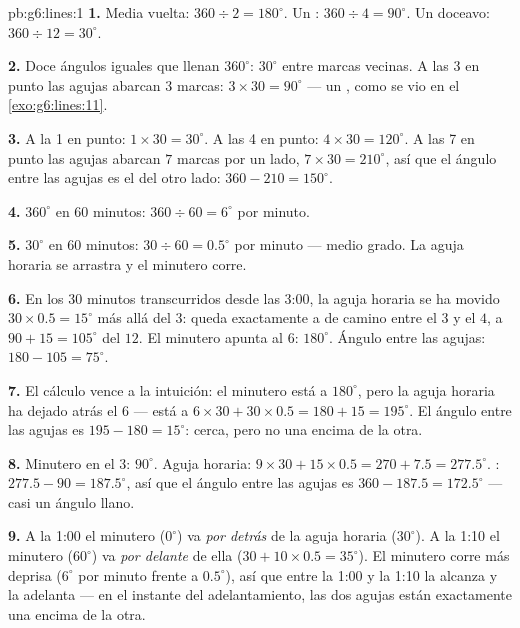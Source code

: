 \begin{solution}{pb:g6:lines:1}
\textbf{1.} Media vuelta: $360 \div 2 = 180^\circ$. Un :
$360 \div 4 = 90^\circ$. Un doceavo: $360 \div 12 = 30^\circ$.

\textbf{2.} Doce ángulos iguales que llenan $360^\circ$:
$30^\circ$ entre marcas vecinas. A las 3 en punto las agujas
abarcan $3$ marcas: $3 \times 30 = 90^\circ$ --- un , como se
vio en el \cref{exo:g6:lines:11}.

\textbf{3.} A la 1 en punto: $1 \times 30 = 30^\circ$. A las
4 en punto: $4 \times 30 = 120^\circ$. A las 7 en punto las agujas
abarcan $7$ marcas por un lado, $7 \times 30 = 210^\circ$, así que el
ángulo entre las agujas es el del otro lado:
$360 - 210 = 150^\circ$.

\textbf{4.} $360^\circ$ en $60$ minutos: $360 \div 60 =
6^\circ$ por minuto.

\textbf{5.} $30^\circ$ en $60$ minutos: $30 \div 60 = 0.5^\circ$
por minuto --- medio grado. La aguja horaria se arrastra y el
minutero corre.

\textbf{6.} En los $30$ minutos transcurridos desde las 3:00, la aguja horaria se ha
movido $30 \times 0.5 = 15^\circ$ más allá del $3$: queda exactamente
a  de camino entre el $3$ y el $4$, a $90 + 15 = 105^\circ$
del $12$. El minutero apunta al $6$:
$180^\circ$. Ángulo entre las agujas:
$180 - 105 = 75^\circ$.

\textbf{7.} El cálculo vence a la intuición: el minutero está a
$180^\circ$, pero la aguja horaria ha dejado atrás el $6$ --- está a
$6 \times 30 + 30 \times 0.5 = 180 + 15 = 195^\circ$. El ángulo
entre las agujas es $195 - 180 = 15^\circ$: cerca, pero no una
encima de la otra.

\textbf{8.} Minutero en el $3$: $90^\circ$. Aguja horaria:
$9 \times 30 + 15 \times 0.5 = 270 + 7.5 = 277.5^\circ$.
: $277.5 - 90 = 187.5^\circ$, así que el ángulo entre las
agujas es $360 - 187.5 = 172.5^\circ$ --- casi un ángulo
llano.

\textbf{9.} A la 1:00 el minutero ($0^\circ$) va \emph{por detrás}
de la aguja horaria ($30^\circ$). A la 1:10 el minutero
($60^\circ$) va \emph{por delante} de ella
($30 + 10 \times 0.5 = 35^\circ$). El minutero corre más deprisa
($6^\circ$ por minuto frente a $0.5^\circ$), así que entre la 1:00 y
la 1:10 la alcanza y la adelanta --- en el instante del
adelantamiento, las dos agujas están exactamente una encima de la otra.


\end{solution}
